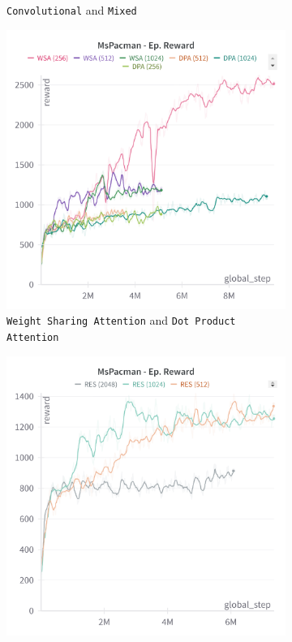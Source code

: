 \begin{figure}[ht]
\begin{subfigure}[b]{0.45\textwidth}
        \caption{\texttt{Convolutional} and \texttt{Mixed}}
        \label{fig:mspacman_cnn_mixed}
    \end{subfigure}
    \hfill
    \begin{subfigure}[b]{0.45\textwidth}
        \centering
        \includegraphics[width=\textwidth]{images/mspacman_wsa_dpa.png}
        \caption{\texttt{Weight Sharing Attention} and \texttt{Dot Product Attention}}
        \label{fig:mspacman_wsa_dpa}
    \end{subfigure}
    \hfill
    \begin{subfigure}[b]{0.45\textwidth}
        \centering
        \includegraphics[width=\textwidth]{images/mspacman_res.png}

\end{subfigure}
\end{figure}
